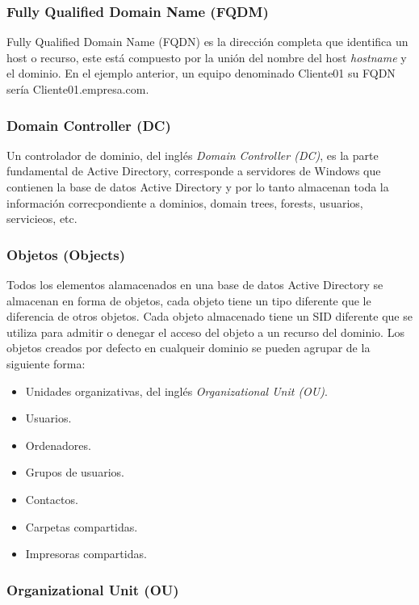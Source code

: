 \subsubsection{Fully Qualified Domain Name (FQDM)}

Fully Qualified Domain Name (FQDN) es la dirección completa que identifica un host o recurso, este está compuesto por la unión del nombre del host {\it hostname} y el dominio. En el ejemplo anterior, un equipo denominado Cliente01 su FQDN sería Cliente01.empresa.com. 

\subsubsection{Domain Controller (DC)}

Un controlador de dominio, del inglés {\it Domain Controller (DC)}, es la parte fundamental de Active Directory, corresponde a servidores de Windows que contienen la base de datos Active Directory y por lo tanto almacenan toda la información correcpondiente a dominios, domain trees, forests, usuarios, servicieos, etc. 

\subsubsection{Objetos (Objects)}

Todos los elementos alamacenados en una base de datos Active Directory se almacenan en forma de objetos, cada objeto tiene un tipo diferente que le diferencia de otros objetos. Cada objeto almacenado tiene un SID diferente que se utiliza para admitir o denegar el acceso del objeto a un recurso del dominio. Los objetos creados por defecto en cualqueir dominio se pueden agrupar de la siguiente forma: 

\begin{itemize}
\item Unidades organizativas, del inglés {\it Organizational Unit (OU)}. 
\item Usuarios.
\item Ordenadores. 
\item Grupos de usuarios.
\item Contactos.
\item Carpetas compartidas. 
\item Impresoras compartidas.
\end{itemize}

\subsubsection{Organizational Unit (OU)}

